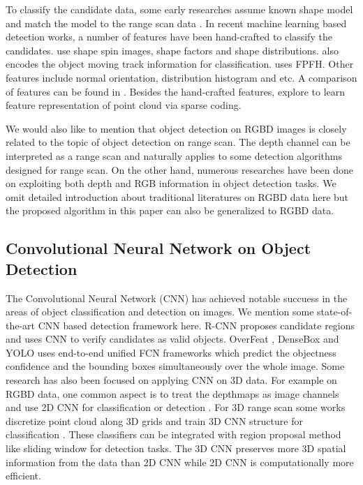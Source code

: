 \documentclass[conference]{IEEEtran}
\begin{document}
To classify the candidate data, some early researches assume known shape model and match the model to the range scan data \cite{Faugeras1986, Johnson1999}. In recent machine learning based detection works, a number of features have been hand-crafted to classify the candidates. \citet{Triebel2006, Wang2012, Teichman2011} use shape spin images, shape factors and shape distributions.  \citet{Teichman2011} also encodes the object moving track information for classification. \citet{Papon2013} uses FPFH. Other features include normal orientation, distribution histogram and etc. A comparison of features can be found in \cite{Behley2012}. Besides the hand-crafted features, \citet{Deuge2013, Lai2014} explore to  learn feature representation of point cloud via sparse coding. 

We would also like to mention that object detection on RGBD images \cite{Chen2015, Lin2013} is closely related to the topic of object detection on range scan. The depth channel can be interpreted as a range scan and naturally applies to some detection algorithms designed for range scan. On the other hand, numerous researches have been done on exploiting both depth and RGB information in object detection tasks. We omit detailed introduction about traditional literatures on RGBD data here but the proposed algorithm in this paper can also be generalized to RGBD data.

\subsection{Convolutional Neural Network on Object Detection}

The Convolutional Neural Network (CNN) has achieved notable succuess in the areas of object classification and detection on images. We mention some state-of-the-art CNN based detection framework here. R-CNN \cite{Girshick2014} proposes candidate regions and uses CNN to verify candidates as valid objects. OverFeat \cite{Sermanet2013}, DenseBox \cite{Huang2015} and YOLO \cite{Redmon2015} uses end-to-end unified FCN frameworks which predict the objectness confidence and the bounding boxes simultaneously over the whole image. Some research has also been focused on applying CNN on 3D data. For example on RGBD data, one common aspect is to treat the depthmaps as image channels and use 2D CNN for classification or detection \cite{Gupta2014, Schwarz2015, Socher2012}. For 3D range scan some works discretize point cloud along 3D grids and train 3D CNN structure for classification \cite{Wu2015, Maturana2015}. These classifiers can be integrated with region proposal method like sliding window \cite{Song2014} for detection tasks. The 3D CNN preserves more 3D spatial information from the data than 2D CNN while 2D CNN is computationally more efficient. 
\end{document}
